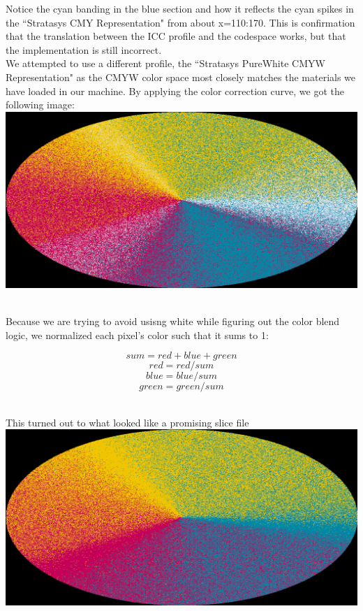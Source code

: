 \documentclass{article}
\begin{document}
\begin{multicols}{2}
\noindent
Notice the cyan banding in the blue section and how it reflects the cyan spikes in the ``Stratasys CMY Representation" from about x=110:170. This is confirmation that the translation between the ICC profile and the codespace works, but that the implementation is still incorrect. 
\\

\noindent
We attempted to use a different profile, the ``Stratasys PureWhite CMYW Representation" as the CMYW color space most closely matches the materials we have loaded in our machine. By applying the color correction curve, we got the following image:
\\

\noindent
\includegraphics[width=\columnwidth]{cmyw-no-normalization}
\

\noindent
Because we are trying to avoid usisng white while figuring out the color blend logic, we normalized each pixel's color such that it sums to 1:

\begin{equation}
	sum = red + blue + green
\end{equation}
\begin{equation}
	red = red / sum
\end{equation}
\begin{equation}
	blue = blue / sum	
\end{equation}
\begin{equation}
	green = green / sum
\end{equation}
\

\noindent
This turned out to what looked like a promising slice file
\\

\noindent
\includegraphics[width=\columnwidth]{cmyw-normalization}
\


\end{multicols}
\end{document}
